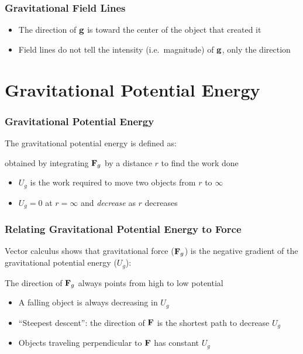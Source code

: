 \documentclass[12pt,compress,aspectratio=169]{beamer}
\newcommand{\mb}[1]{\ensuremath\mathbf{#1}}
\newcommand{\eq}[2]{\vspace{#1}{\Large\begin{displaymath}#2\end{displaymath}}}
\begin{document}
\begin{frame}
  \frametitle{Gravitational Field Lines}
  \begin{center}
  \end{center}
  \begin{itemize}
  \item The direction of $\mb{g}$ is toward the center of the object that
    created it
  \item Field lines do not tell the intensity (i.e.\ magnitude) of $\mb{g}$,
    only the direction
  \end{itemize}
\end{frame}




\section{Gravitational Potential Energy}


\begin{frame}
  \frametitle{Gravitational Potential Energy}
  The gravitational potential energy is defined as:
  
  \eq{-.1in}{
    \boxed{U_g=-\frac{Gm_1m_2}{r}}
  }
  obtained by integrating $\mb{F}_g$ by a distance $r$ to find the work done
  \begin{itemize}
  \item $U_g$ is the work required to move two objects from $r$ to $\infty$
  \item $U_g=0$ at $r=\infty$ and \emph{decrease} as $r$ decreases
  \end{itemize}
\end{frame}


\begin{frame}
  \frametitle{Relating Gravitational Potential Energy to Force}

  Vector calculus shows that gravitational force ($\mb{F}_g$) is the negative
  gradient of the gravitational potential energy ($U_g$):
  
  \eq{-.1in}{
    \mb{F}_g=-\nabla U_g=
    -\frac{\partial U_g}{\partial r}\hat{\mb{r}}
  }

  The direction of $\mb{F}_g$ always points from high to low potential
  \begin{itemize}
  \item A falling object is always decreasing in $U_g$
  \item ``Steepest descent'': the direction of $\mb{F}$ is the shortest path
    to decrease $U_g$ 
  \item Objects traveling perpendicular to $\mb{F}$ has constant $U_g$
  \end{itemize}
\end{frame}
\end{document}
